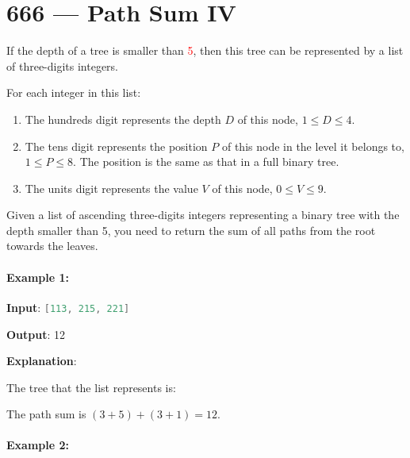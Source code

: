 \section{666 --- Path Sum IV}
If the depth of a tree is smaller than \textcolor{red}{5}, then this tree can be represented by a list of three-digits integers.

For each integer in this list:

\begin{enumerate}
\item The hundreds digit represents the depth $D$ of this node, $1 \leq D \leq 4$.
\item The tens digit represents the position $P$ of this node in the level it belongs to, $1 \leq P \leq 8$. The position is the same as that in a full binary tree.
\item The units digit represents the value $V$ of this node, $0 \leq V \leq 9$.

\end{enumerate}
 

Given a list of ascending three-digits integers representing a binary tree with the depth smaller than 5, you need to return the sum of all paths from the root towards the leaves.

\paragraph{Example 1:}

\begin{flushleft}
\textbf{Input}: \lstinline[language=C++, basicstyle=\small\ttfamily, keywordstyle=\bfseries\color{green!40!black}]|[113, 215, 221]|

\textbf{Output}: 12

\textbf{Explanation}: 

The tree that the list represents is:

\begin{figure}[H]
\end{figure}

The path sum is $(3 + 5) + (3 + 1) = 12$.
\end{flushleft}

 

\paragraph{Example 2:}

